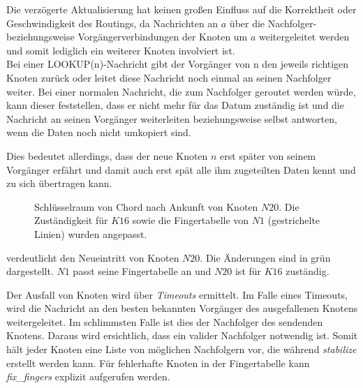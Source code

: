Die verzögerte Aktualisierung hat keinen großen Einfluss auf die Korrektheit oder Geschwindigkeit des Routings, da Nachrichten an $a$ über die Nachfolger- beziehungsweise Vorgängerverbindungen der Knoten um $a$ weitergeleitet werden und somit lediglich ein weiterer Knoten involviert ist.\\
Bei einer LOOKUP(n)-Nachricht gibt der Vorgänger von n den jeweils richtigen Knoten zurück oder leitet diese Nachricht noch einmal an seinen Nachfolger weiter. Bei einer normalen Nachricht, die zum Nachfolger geroutet werden würde, kann dieser feststellen, dass er nicht mehr für das Datum zuständig ist und die Nachricht an seinen Vorgänger weiterleiten beziehungsweise selbst antworten, wenn die Daten noch nicht umkopiert sind. 

Dies bedeutet allerdings, dass der neue Knoten $n$ erst später von seinem Vorgänger erfährt und damit auch erst spät alle ihm zugeteilten Daten kennt und zu sich übertragen kann.

\begin{figure}[htbp]
\centering
{}
\caption{Schlüsselraum von Chord nach Ankunft von Knoten $N20$. Die Zuständigkeit für $K16$ sowie die Fingertabelle von $N1$ (gestrichelte Linien) wurden angepasst.}
\label{fig:chord_new_node}
\end{figure}

 verdeutlicht den Neueintritt von Knoten $N20$. Die Änderungen sind in grün dargestellt. $N1$ passt seine Fingertabelle an und $N20$ ist für $K16$ zuständig.

Der Ausfall von Knoten wird über \emph{Timeouts} ermittelt. Im Falle eines Timeouts, wird die Nachricht an den besten bekannten Vorgänger des ausgefallenen Knotens weitergeleitet. Im schlimmsten Falle ist dies der Nachfolger des sendenden Knotens. Daraus wird ersichtlich, dass ein valider Nachfolger notwendig ist. Somit hält jeder Knoten eine Liste von möglichen Nachfolgern vor, die während \emph{stabilize} erstellt werden kann. Für fehlerhafte Knoten in der Fingertabelle kann \emph{fix\_fingers} explizit aufgerufen werden.

